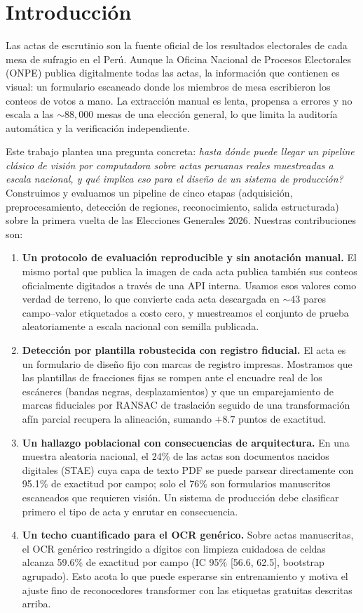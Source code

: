 \documentclass[conference]{IEEEtran}
\begin{document}
\section{Introducci\'on}
Las actas de escrutinio son la fuente oficial de los resultados electorales
de cada mesa de sufragio en el Per\'u. Aunque la Oficina Nacional de Procesos
Electorales (ONPE) publica digitalmente todas las actas, la informaci\'on que
contienen es visual: un formulario escaneado donde los miembros de mesa
escribieron los conteos de votos a mano. La extracci\'on manual es lenta,
propensa a errores y no escala a las ${\sim}88{,}000$ mesas de una elecci\'on
general, lo que limita la auditor\'ia autom\'atica y la verificaci\'on
independiente.

Este trabajo plantea una pregunta concreta: \emph{\textquestiondown hasta
d\'onde puede llegar un pipeline cl\'asico de visi\'on por computadora sobre
actas peruanas reales muestreadas a escala nacional, y qu\'e implica eso para
el dise\~no de un sistema de producci\'on?} Construimos y evaluamos un
pipeline de cinco etapas (adquisici\'on, preprocesamiento, detecci\'on de
regiones, reconocimiento, salida estructurada) sobre la primera vuelta de las
Elecciones Generales 2026. Nuestras contribuciones son:

\begin{enumerate}
\item \textbf{Un protocolo de evaluaci\'on reproducible y sin anotaci\'on
manual.} El mismo portal que publica la imagen de cada acta publica tambi\'en
sus conteos oficialmente digitados a trav\'es de una API interna. Usamos esos
valores como verdad de terreno, lo que convierte cada acta descargada en
${\sim}43$ pares campo--valor etiquetados a costo cero, y muestreamos el
conjunto de prueba aleatoriamente a escala nacional con semilla publicada.
\item \textbf{Detecci\'on por plantilla robustecida con registro fiducial.}
El acta es un formulario de dise\~no fijo con marcas de registro impresas.
Mostramos que las plantillas de fracciones fijas se rompen ante el encuadre
real de los esc\'aneres (bandas negras, desplazamientos) y que un
emparejamiento de marcas fiduciales por RANSAC de traslaci\'on seguido de una
transformaci\'on af\'in parcial recupera la alineaci\'on, sumando $+8.7$
puntos de exactitud.
\item \textbf{Un hallazgo poblacional con consecuencias de arquitectura.} En
una muestra aleatoria nacional, el 24\% de las actas son documentos nacidos
digitales (STAE) cuya capa de texto PDF se puede parsear directamente con
95.1\% de exactitud por campo; solo el 76\% son formularios manuscritos
escaneados que requieren visi\'on. Un sistema de producci\'on debe clasificar
primero el tipo de acta y enrutar en consecuencia.
\item \textbf{Un techo cuantificado para el OCR gen\'erico.} Sobre actas
manuscritas, el OCR gen\'erico restringido a d\'igitos con limpieza cuidadosa
de celdas alcanza 59.6\% de exactitud por campo (IC 95\% [56.6, 62.5],
bootstrap agrupado). Esto acota lo que puede esperarse sin entrenamiento y
motiva el ajuste fino de reconocedores transformer con las etiquetas
gratuitas descritas arriba.
\end{enumerate}
\end{document}
